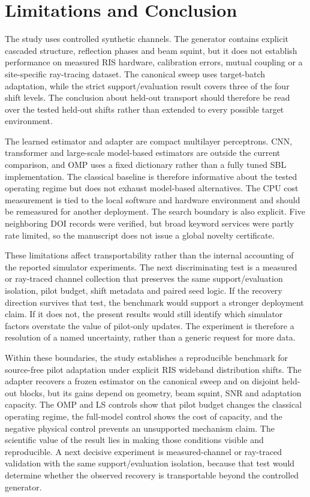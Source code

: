 \documentclass[10pt,twocolumn]{article}
\begin{document}
\section{Limitations and Conclusion}

The study uses controlled synthetic channels. The generator contains explicit cascaded structure, reflection phases and beam squint, but it does not establish performance on measured RIS hardware, calibration errors, mutual coupling or a site-specific ray-tracing dataset. The canonical sweep uses target-batch adaptation, while the strict support/evaluation result covers three of the four shift levels. The conclusion about held-out transport should therefore be read over the tested held-out shifts rather than extended to every possible target environment.

The learned estimator and adapter are compact multilayer perceptrons. CNN, transformer and large-scale model-based estimators are outside the current comparison, and OMP uses a fixed dictionary rather than a fully tuned SBL implementation. The classical baseline is therefore informative about the tested operating regime but does not exhaust model-based alternatives. The CPU cost measurement is tied to the local software and hardware environment and should be remeasured for another deployment. The search boundary is also explicit. Five neighboring DOI records were verified, but broad keyword services were partly rate limited, so the manuscript does not issue a global novelty certificate.

These limitations affect transportability rather than the internal accounting of the reported simulator experiments. The next discriminating test is a measured or ray-traced channel collection that preserves the same support/evaluation isolation, pilot budget, shift metadata and paired seed logic. If the recovery direction survives that test, the benchmark would support a stronger deployment claim. If it does not, the present results would still identify which simulator factors overstate the value of pilot-only updates. The experiment is therefore a resolution of a named uncertainty, rather than a generic request for more data.

Within these boundaries, the study establishes a reproducible benchmark for source-free pilot adaptation under explicit RIS wideband distribution shifts. The adapter recovers a frozen estimator on the canonical sweep and on disjoint held-out blocks, but its gains depend on geometry, beam squint, SNR and adaptation capacity. The OMP and LS controls show that pilot budget changes the classical operating regime, the full-model control shows the cost of capacity, and the negative physical control prevents an unsupported mechanism claim. The scientific value of the result lies in making those conditions visible and reproducible. A next decisive experiment is measured-channel or ray-traced validation with the same support/evaluation isolation, because that test would determine whether the observed recovery is transportable beyond the controlled generator.
\end{document}

